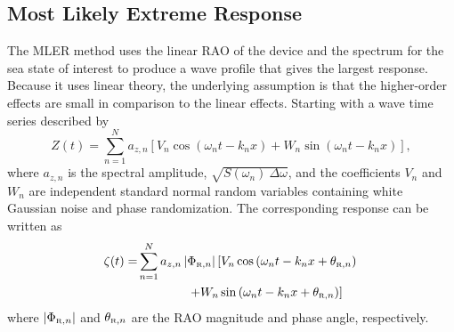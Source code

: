 \subsection{Most Likely Extreme Response}
The MLER method uses the linear RAO of the device and the spectrum for the sea state of interest to produce a wave profile that gives the largest response. Because it uses linear theory, the underlying assumption is that the higher-order effects are small in comparison to the linear effects.
Starting with a wave time series described by 
\begin{equation}
   Z(t) = \sum_{n=1}^N a_{z,n} \left[ V_n \cos\left(\omega_n t - k_n x\right) + W_n \sin\left(\omega_n t - k_n x\right) \right],
\label{eq:drummen1}
\end{equation}
where $a_{z,n}$ is the spectral amplitude, $\sqrt{S(\omega_n)~\Delta\omega}$, and the coefficients $V_n$ and $W_n$ are independent standard normal random variables containing white Gaussian noise and phase randomization.  
The corresponding response can be written as
\begin{align}
   \zeta(t) = &\sum_{n=1}^N a_{z,n} \left|\Phi_{\text{\tiny{R}},n}\right| 
            \left[V_n \cos\left(\omega_n t - k_n x + \theta_{\text{\tiny{R}},n}\right)\right.\nonumber\\
            &\qquad\qquad\left.+ W_n \sin\left(\omega_n t - k_n x + \theta_{\text{\tiny{R}},n}\right) \right]
\label{eq:drummen7}
\end{align}
where $\left|\Phi_{\text{\tiny{R}},n}\right|$ and $\theta_{\text{\tiny{R}},n}$ are the RAO magnitude and phase angle, respectively.

